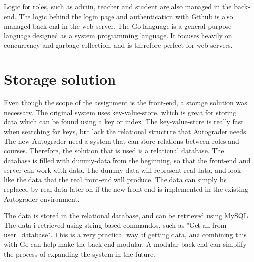 Logic for roles, such as admin, teacher and student are also managed in the back-end. The logic behind the login page and authentication with Github is also managed back-end in the web-server. The Go language is a general-purpose language designed as a system programming language. It focuses heavily on concurrency and garbage-collection, and is therefore perfect for web-servers.

\section{Storage solution}
Even though the scope of the assignment is the front-end, a storage solution was necessary. The original system uses key-value-store, which is great for storing data which can be found using a key or index. The key-value-store is really fast when searching for keys, but lack the relational structure that Autograder needs. The new Autograder need a system that can store relations between roles and courses. Therefore, the solution that is used is a relational database. The database is filled with dummy-data from the beginning, so that the front-end and server can work with data. The dummy-data will represent real data, and look like the data that the real front-end will produce. The data can simply be replaced by real data later on if the new front-end is implemented in the existing Autograder-environment.

The data is stored in the relational database, and can be retrieved using MySQL. The data i retrieved using string-based commandos, such as "Get all from user\_database". This is a very practical way of getting data, and combining this with Go can help make the back-end modular. A modular back-end can simplify the process of expanding the system in the future.

